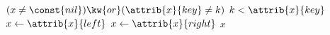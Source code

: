 \begin{codebox}
\li \While $(x \neq \const{nil}) \kw{ or } (\attrib{x}{key} \neq k)$
\li \Do
		\If $k < \attrib{x}{key}$
\li 	\Then
			$x \gets \attrib{x}{left}$
\li 	\Else
\li			$x \gets \attrib{x}{right}$
		\End
	\End
\li \Return $x$
\end{codebox}